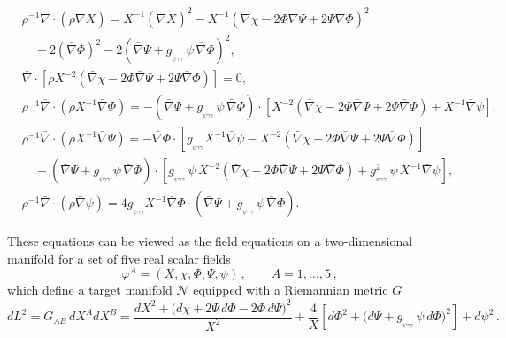 \documentclass[11pt]{article}
\numberwithin{equation}{section} %
\begin{document}
\begin{subequations}\label{eq:dimred}
\begin{align}
\label{eq:dimred-a}
& \rho^{-1}\bar{\nabla}\cdot\left(\rho \bar{\nabla}X\right)
 = X^{-1}\left(\bar{\nabla}X\right)^2
 - X^{-1}\left(\bar{\nabla}\chi - 2\Phi \bar{\nabla}\Psi
               + 2\Psi \bar{\nabla}\Phi\right)^2
\\\nonumber
& \quad
 - 2\left(\bar{\nabla}\Phi\right)^2
 - 2\left(\bar{\nabla}\Psi
          + g_{_{\psi\gamma\gamma}}\,\psi\,\bar{\nabla}\Phi\right)^2,
\\[10pt]
%
\label{eq:dimred-b}
& \bar{\nabla}\cdot\left[\rho X^{-2}
   \left(\bar{\nabla}\chi - 2\Phi \bar{\nabla}\Psi
         + 2\Psi \bar{\nabla}\Phi\right)\right] = 0,
\\[10pt]
%
\label{eq:dimred-c}
& \rho^{-1}\bar{\nabla}\cdot\left(\rho X^{-1}\bar{\nabla}\Phi\right)
 = -\left(\bar{\nabla}\Psi
          + g_{_{\psi\gamma\gamma}}\,\psi\,\bar{\nabla}\Phi\right)\cdot
   \left[X^{-2}\left(\bar{\nabla}\chi - 2\Phi \bar{\nabla}\Psi
                     + 2\Psi \bar{\nabla}\Phi\right)
        + X^{-1}\bar{\nabla}\psi\right],
\\[10pt]
%
\label{eq:dimred-d}
& \rho^{-1}\bar{\nabla}\cdot\left(\rho X^{-1}\bar{\nabla}\Psi\right)
 = -\bar{\nabla}\Phi\cdot
   \left[g_{_{\psi\gamma\gamma}} X^{-1}\bar{\nabla}\psi
        - X^{-2}\left(\bar{\nabla}\chi - 2\Phi \bar{\nabla}\Psi
                     + 2\Psi \bar{\nabla}\Phi\right)\right]
\\\nonumber
& \quad
 +\left(\bar{\nabla}\Psi
        + g_{_{\psi\gamma\gamma}}\,\psi\,\bar{\nabla}\Phi\right)\cdot
   \left[g_{_{\psi\gamma\gamma}}\,\psi\,X^{-2}
         \left(\bar{\nabla}\chi - 2\Phi \bar{\nabla}\Psi
              + 2\Psi \bar{\nabla}\Phi\right)
        + g_{_{\psi\gamma\gamma}}^{2}\,\psi\,X^{-1}\bar{\nabla}\psi\right],
\\[10pt]
%
\label{eq:dimred-e}
& \rho^{-1}\bar{\nabla}\cdot\left(\rho \bar{\nabla}\psi\right)
 = 4 g_{_{\psi\gamma\gamma}} X^{-1}
   \bar{\nabla}\Phi\cdot
   \left(\bar{\nabla}\Psi
        + g_{_{\psi\gamma\gamma}}\,\psi\,\bar{\nabla}\Phi\right).
\end{align}
\end{subequations}


These equations can be viewed as the field equations on a two-dimensional manifold for a set of five real scalar fields
%
\begin{equation}
\varphi^A = (X,\chi,\Phi,\Psi,\psi)\,, \qquad A = 1,\dots,5\,,
\end{equation}
%
which define  a target manifold \(\mathcal{N}\) equipped with a Riemannian metric \(G\)
%
\begin{equation}
dL^2 = G_{AB}\,dX^A dX^B
= \frac{dX^2 + \bigl(d\chi + 2\Psi\,d\Phi - 2\Phi\,d\Psi\bigr)^2}{X^2}
  + \frac{4}{X}\left[d\Phi^2 
    + \bigl(d\Psi + g_{_{\psi\gamma\gamma}}\,\psi\,d\Phi\bigr)^2\right]
  + d\psi^2 \,.
\end{equation}
\end{document}
